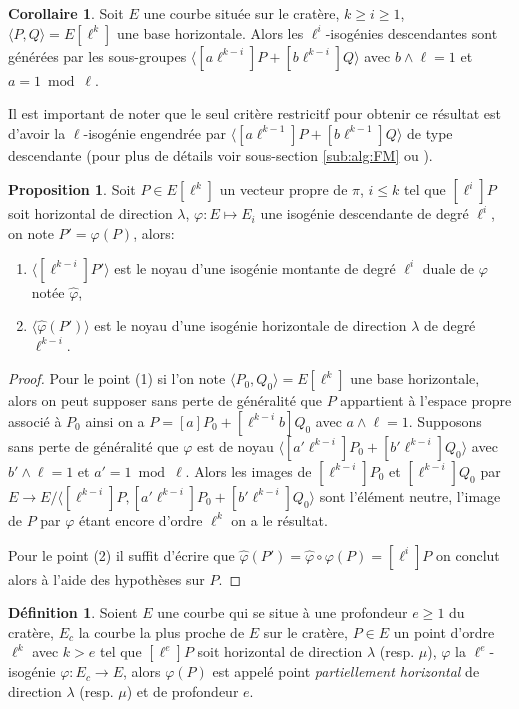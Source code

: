 \documentclass[10pt,a4paper]{book}
\theoremstyle{plain}
\theoremstyle{definition}
\theoremstyle{definition}
\newtheorem{cor}[thm]{Corollaire}
\theoremstyle{definition}
\newtheorem{prop}[thm]{Proposition}
\theoremstyle{definition}
\newtheorem{defi}[thm]{Définition}
\theoremstyle{remark}
\theoremstyle{remark}
\theoremstyle{definition}
\begin{document}
\begin{cor}
Soit $E$ une courbe située sur le cratère, $k\geqslant i \geqslant 1$, $\langle P, Q \rangle= E[\ell^k]$ une base horizontale. Alors les $\ell^i$-isogénies descendantes sont générées par les sous-groupes $\langle [a\ell^{k-i}]P+ [b\ell^{k-i}]Q \rangle$ avec $b \wedge \ell =1$ et $a = 1 \bmod \ell$.
\end{cor}
Il est important de noter que le seul critère restricitf pour obtenir ce résultat est d'avoir la $\ell$-isogénie engendrée par $\langle [a \ell^{k-1}]P+ [b \ell^{k-1}]Q \rangle $ de type descendante (pour plus de détails voir sous-section \ref{sub:alg:FM} ou \cite{FouquetMorain02}).

\begin{prop}
Soit $P \in E[\ell^k]$ un vecteur propre de $\pi$, $i\leqslant k$ tel que $[\ell^i]P$ soit horizontal de direction $\lambda$, $\varphi:E \mapsto E_i$ une isogénie descendante de degré $\ell^i$, on note $P'=\varphi(P)$, alors:
\begin{enumerate}
\item  $\langle [\ell^{k-i}]P' \rangle$ est le noyau d'une isogénie montante de degré $\ell^{i}$ duale de $\varphi$ notée $\widehat{\varphi}$, 
\item  $\langle \widehat{\varphi}(P') \rangle$ est le noyau d'une isogénie horizontale de direction $\lambda$ de degré $\ell^{k-i}$.  
\end{enumerate}
\end{prop}


\begin{proof}
Pour le point (1) si l'on note $\langle P_0, Q_0 \rangle =E[\ell^k]$ une base horizontale, alors on peut supposer sans perte de généralité que $P$ appartient à l'espace propre associé à  $P_0$ ainsi on a $P=[a]P_0+[\ell^{k-i}b]Q_0$ avec $a \wedge \ell =1$. Supposons sans perte de généralité que $\varphi$ est de noyau $\langle [a'\ell^{k-i}]P_0+[b'\ell^{k-i}]Q_0 \rangle$ avec $b' \wedge \ell =1$ et $a' = 1 \bmod \ell$. Alors les images de $[\ell^{k-i}]P_0$ et $[\ell^{k-i}]Q_0$ par $E \rightarrow E/\langle [\ell^{k-i}]P,[a'\ell^{k-i}]P_0+[b'\ell^{k-i}]Q_0  \rangle $ sont l'élément neutre, l'image de $P$ par $\varphi$ étant encore d'ordre $\ell^k$ on a le résultat.

Pour le point (2) il suffit d'écrire que $\widehat{\varphi}(P')=\widehat{\varphi}\circ \varphi (P)= [\ell^i] P$ on conclut alors à l'aide des hypothèses sur $P$.
\end{proof}

\begin{defi}
Soient $E$ une courbe qui se situe à une profondeur $e \geqslant 1$ du cratère, $E_c$ la courbe la plus proche de $E$ sur le cratère, $P \in E$ un point d'ordre $\ell^k$ avec $k>e$ tel que $[\ell^e]P$ soit horizontal de direction $\lambda$ (resp. $\mu$), $\varphi$ la $\ell^e$-isogénie $\varphi:E_c \rightarrow E$, alors $\varphi(P)$ est appelé point \emph{partiellement horizontal} de direction $\lambda$ (resp. $\mu$) et de profondeur $e$.
\end{defi}
\end{document}
